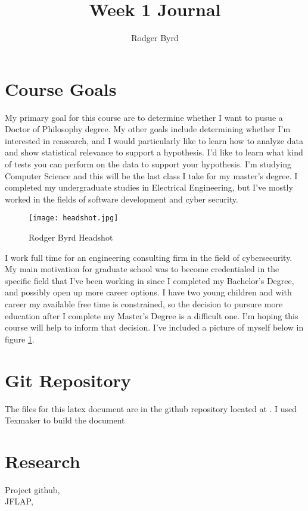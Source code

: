 \documentclass{article}
\begin{document}
\doublespacing

\title{Week 1 Journal}
\author{Rodger Byrd}
\maketitle


\section{Course Goals}
My primary goal for this course are to determine whether I want to pusue a Doctor of Philosophy degree. My other goals include determining whether I'm interested in reasearch, and I would particularly like to learn how to analyze data and show statistical relevance to support a hypothesis. I'd like to learn what kind of tests you can perform on the data to support your hypothesis. I'm studying Computer Science and this will be the last class I take for my master's degree. I completed my undergraduate studies in Electrical Engineering, but I've mostly worked in the fields of software development and cyber security.
\begin{figure}[H]
  \centerline{\texttt{[image: headshot.jpg]}}
  \caption{Rodger Byrd Headshot}
  \label{fig:HS}
\end{figure} 
I work full time for an engineering consulting firm in the field of cybersecurity. My main motivation for graduate school was to become credentialed in the specific field that I've been working in since I completed my Bachelor's Degree, and possibly open up more career options. I have two young children and with career my available free time is constrained, so the decision to pursure more education after I complete my Master's Degree is a difficult one. I'm hoping this course will help to inform that decision. I've included a picture of myself below in figure \ref{fig:HS}.


\section{Git Repository}
The files for this latex document are in the github repository located at . I used Texmaker to build the document 

\section{Research}


\begin{thebibliography}{9}
Project github, \\
JFLAP, \\
\end{thebibliography}
\end{document}

